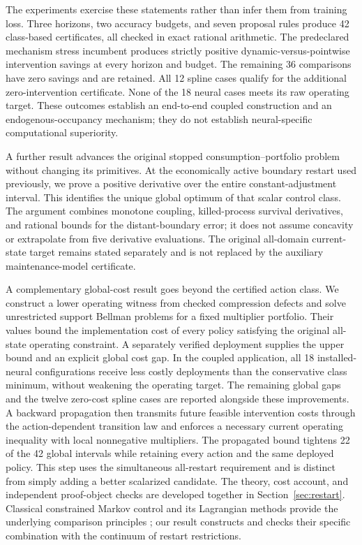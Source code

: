 The experiments exercise these statements rather than infer them from training loss. Three horizons, two accuracy budgets, and seven proposal rules produce 42 class-based certificates, all checked in exact rational arithmetic. The predeclared mechanism stress incumbent produces strictly positive dynamic-versus-pointwise intervention savings at every horizon and budget. The remaining 36 comparisons have zero savings and are retained. All 12 spline cases qualify for the additional zero-intervention certificate. None of the 18 neural cases meets its raw operating target. These outcomes establish an end-to-end coupled construction and an endogenous-occupancy mechanism; they do not establish neural-specific computational superiority.

A further result advances the original stopped consumption--portfolio problem without changing its primitives. At the economically active boundary restart used previously, we prove a positive derivative over the entire constant-adjustment interval. This identifies the unique global optimum of that scalar control class. The argument combines monotone coupling, killed-process survival derivatives, and rational bounds for the distant-boundary error; it does not assume concavity or extrapolate from five derivative evaluations. The original all-domain current-state target remains stated separately and is not replaced by the auxiliary maintenance-model certificate.

A complementary global-cost result goes beyond the certified action class. We construct a lower operating witness from checked compression defects and solve unrestricted support Bellman problems for a fixed multiplier portfolio. Their values bound the implementation cost of every policy satisfying the original all-state operating constraint. A separately verified deployment supplies the upper bound and an explicit global cost gap. In the coupled application, all 18 installed-neural configurations receive less costly deployments than the conservative class minimum, without weakening the operating target. The remaining global gaps and the twelve zero-cost spline cases are reported alongside these improvements. A backward propagation then transmits future feasible intervention costs through the action-dependent transition law and enforces a necessary current operating inequality with local nonnegative multipliers. The propagated bound tightens 22 of the 42 global intervals while retaining every action and the same deployed policy. This step uses the simultaneous all-restart requirement and is distinct from simply adding a better scalarized candidate. The theory, cost account, and independent proof-object checks are developed together in Section~\ref{sec:restart}. Classical constrained Markov control and its Lagrangian methods provide the underlying comparison principles \citep{Altman1999}; our result constructs and checks their specific combination with the continuum of restart restrictions.

